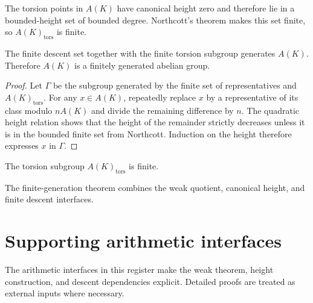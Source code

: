 \begin{lemma}
\label{mumford-lem-rational-torsion-finite}
The torsion points in $A(K)$ have canonical height zero and therefore lie in a
bounded-height set of bounded degree.  Northcott's theorem makes this set
finite, so $A(K)_{\mathrm{tors}}$ is finite.
\notready
\end{lemma}

\begin{theorem}
\label{mumford-thm-mordell-weil-descent}
The finite descent set together with the finite torsion subgroup generates
$A(K)$.  Therefore $A(K)$ is a finitely generated abelian group.
\begin{proof}
Let $\Gamma$ be the subgroup generated by the finite set of representatives
and $A(K)_{\mathrm{tors}}$.  For any $x\in A(K)$, repeatedly replace $x$ by a
representative of its class modulo $nA(K)$ and divide the remaining difference
by $n$.  The quadratic height relation shows that the height of the remainder
strictly decreases unless it is in the bounded finite set from Northcott.
Induction on the height therefore expresses $x$ in $\Gamma$.
\end{proof}
\notready
\end{theorem}

\begin{corollary}
\label{mumford-cor-finite-torsion}
The torsion subgroup $A(K)_{\mathrm{tors}}$ is finite.
\notready
\end{corollary}

\begin{remark}
\label{mumford-app2-mordell-weil-theorem}
The finite-generation theorem combines the weak quotient, canonical height, and
finite descent interfaces.
\notready
\end{remark}

\section{Supporting arithmetic interfaces}
\label{mumford-AppII-coverage-register}
The arithmetic interfaces in this register make the weak theorem, height
construction, and descent dependencies explicit.  Detailed proofs are treated
as external inputs where necessary.

